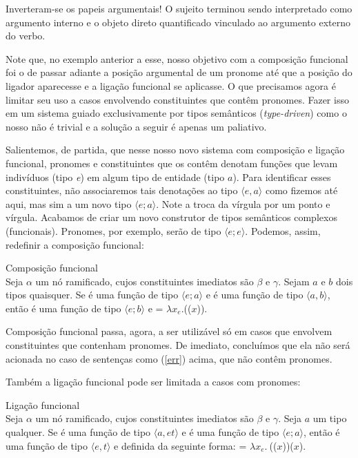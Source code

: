 \n Inverteram-se os papeis argumentais! O sujeito terminou sendo interpretado como argumento interno e o objeto direto quantificado vinculado ao argumento externo do verbo.  

Note que, no exemplo anterior a esse, nosso objetivo com a composição funcional foi o de passar adiante a posição argumental de um pronome até que a posição do ligador aparecesse e a ligação funcional se aplicasse. O que precisamos agora é limitar seu uso a casos envolvendo constituintes que contêm pronomes. Fazer isso em um sistema guiado exclusivamente por tipos semânticos (\textit{type-driven}) como o nosso não é trivial e a solução a seguir é apenas um paliativo. 

Salientemos, de partida, que nesse nosso novo sistema com composição e ligação funcional, pronomes e constituintes que os contêm denotam funções que levam indivíduos (tipo \textit{e}) em algum tipo de entidade (tipo $a$). Para identificar esses constituintes, não associaremos tais denotações ao tipo $\langle e,a \rangle$ como fizemos até aqui, mas sim a um novo tipo  $\langle e;a \rangle$. Note a troca da vírgula por um ponto e vírgula. Acabamos de criar um novo construtor de tipos semânticos complexos (funcionais). Pronomes, por exemplo, serão de tipo $\langle e;e\rangle$. Podemos, assim, redefinir a composição funcional:

\begin{exe}
	\ex Composição funcional \\
	Seja $\alpha$ um nó ramificado, cujos constituintes imediatos são $\beta$ e $\gamma$. Sejam $a$ e $b$ dois tipos quaisquer. Se \den{$\beta$} é uma função de tipo $\langle e;a \rangle$ e \den{$\gamma$} é uma função de tipo $\langle a,b \rangle$, então \den{$\alpha$} é uma função de tipo $\langle e;b \rangle$ e \den{$\alpha$} = $\lambda x_{e}.$\den{$\gamma$}(\den{$\beta$}($x$)).
\end{exe}


\n Composição funcional passa, agora, a ser utilizável só em casos que envolvem constituintes que contenham pronomes. De imediato, concluímos que ela não será acionada no caso de sentenças como (\ref{err}) acima, que não contêm pronomes. 

Também a ligação funcional pode ser limitada a casos com pronomes:

\begin{exe}
	\ex Ligação funcional \\
	Seja $\alpha$ um nó ramificado, cujos constituintes imediatos são $\beta$ e $\gamma$. Seja $a$ um tipo qualquer. Se \den{$\beta$} é uma função de tipo $\langle a,et \rangle$ e \den{$\gamma$} é uma função de tipo $\langle e;a \rangle$, então \den{$\alpha$} é uma função de tipo $\langle e,t \rangle$ e definida da seguinte forma: \den{$\alpha$} = $\lambda x_{e}.\ $\den{$\beta$}(\den{$\gamma$}($x$))($x$).
\end{exe}


